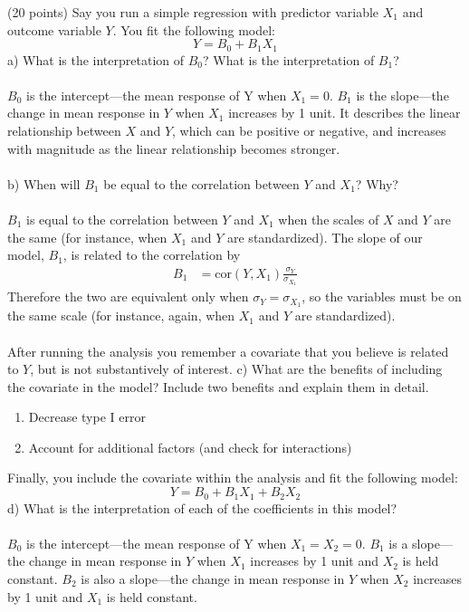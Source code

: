 \documentclass[onecolumn,10pt]{jhwhw}
\begin{document}
\clearpage
\problem{}%
(20 points) Say you run a simple regression with predictor variable $X_1$ and outcome variable $Y$. You fit the following model:
                $$Y = B_0 + B_1 X_1$$
a) What is the interpretation of $B_0$? What is the interpretation of $B_1$?\\
\\
$B_0$ is the intercept---the mean response of Y when $X_1 = 0$. $B_1$ is the slope---the change in mean response in $Y$ when $X_1$ increases by 1 unit. It describes the linear relationship between $X$ and $Y$, which can be positive or negative, and increases with magnitude as the linear relationship becomes stronger.\\
\\
b) When will $B_1$ be equal to the correlation between $Y$ and $X_1$? Why?\\
\\
$B_1$ is equal to the correlation between $Y$ and $X_1$ when the scales of $X$ and $Y$ are the same (for instance, when $X_1$ and $Y$ are standardized).
The slope of our model, $B_1$, is related to the correlation by
\begin{align*}
B_1 &= \mbox{cor}(Y, X_1) \frac{\sigma_Y}{\sigma_{X_1}}
\end{align*}
Therefore the two are equivalent only when $\sigma_{Y} = \sigma_{X_1}$, so the variables must be on the same scale (for instance, again, when $X_1$ and $Y$ are standardized).\\
\\
After running the analysis you remember a covariate that you believe is related to $Y$, but is not substantively of interest.
c) What are the benefits of including the covariate in the model? Include two benefits and explain them in detail.
\begin{enumerate}
\item Decrease type I error
\item Account for additional factors (and check for interactions)
\end{enumerate}
Finally, you include the covariate within the analysis and fit the following model:
                $$Y = B_0 + B_1 X_1 + B_2 X_2$$
d) What is the interpretation of each of the coefficients in this model?\\
\\
$B_0$ is the intercept---the mean response of Y when $X_1 = X_2 = 0$. $B_1$ is a slope---the change in mean response in $Y$ when $X_1$ increases by 1 unit and $X_2$ is held constant. $B_2$ is also a slope---the change in mean response in $Y$ when $X_2$ increases by 1 unit and $X_1$ is held constant. \\
\end{document}
